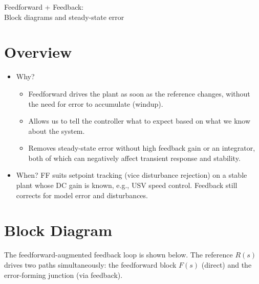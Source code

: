 \documentclass[11pt]{article}
\begin{document}
\begin{center}
  {\LARGE Feedforward + Feedback: \\[0.3ex]
  Block diagrams and steady-state error\par}
\end{center}

\section*{Overview}

\begin{itemize}
  \item Why?
  \begin{itemize}
    \item Feedforward drives the plant as soon as the reference changes, without the need for error to accumulate (windup).   
    \item Allows us to tell the controller what to expect based on what we know about the system. 
    \item Removes steady-state error without high feedback gain or an integrator, both of which can negatively affect transient response and stability.
  \end{itemize}
  \item When? FF suits setpoint tracking (vice disturbance rejection) on a stable plant whose DC gain is known, e.g., USV speed control.  Feedback still corrects for model error and disturbances.
\end{itemize}

\section*{Block Diagram}

The feedforward-augmented feedback loop is shown below.  The reference $R(s)$
drives two paths simultaneously: the feedforward block $F(s)$ (direct) and the
error-forming junction (via feedback).
\end{document}
